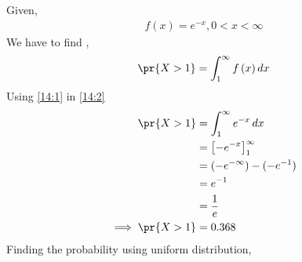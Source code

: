 \providecommand{\fn}[1]{\ensuremath{f\left(#1\right)}}
\providecommand{\e}[1]{\ensuremath{E\left(#1\right)}}

Given,
\begin{align} \label{14:1}
\fn{x} = e^{-x} , 0<x<\infty
\end{align}
We have to find ,
\begin{align}
\pr{X>1} = \int_{1}^{\infty}{\fn{x}}\,dx\label{14:2}
\end{align}
Using \eqref{14:1} in \eqref{14:2}
\begin{align}
\pr{X>1} &= \int_{1}^{\infty}{e^{-x}}\,dx\\
&= \left[-e^{-x}\right]_1^{\infty}\\
&= (-e^{-\infty}) - (-e^{-1})\\
&= e^{-1}\\
&= \frac{1}{e}\\
 \implies \pr{X>1} &= 0.368
\end{align}
Finding the probability using uniform distribution,

